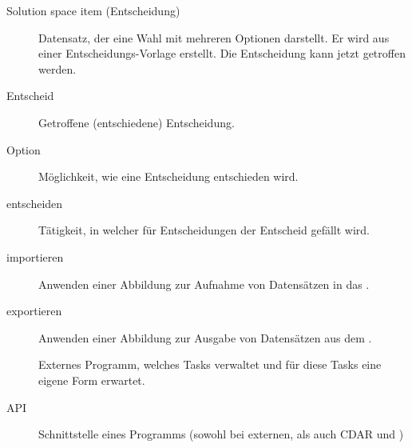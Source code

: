 \begin{description}
			\item[Solution space item (Entscheidung)] Datensatz, der eine Wahl mit mehreren Optionen darstellt.
				Er wird aus einer Entscheidungs-Vorlage erstellt.
				Die Entscheidung kann jetzt getroffen werden.
			\item[Entscheid] Getroffene (entschiedene) Entscheidung.
			\item[Option] Möglichkeit, wie eine Entscheidung entschieden wird.
			\item[entscheiden] Tätigkeit, in welcher für Entscheidungen der Entscheid gefällt wird.
			\item[importieren] Anwenden einer Abbildung zur Aufnahme von Datensätzen in das \eeppi.
			\item[exportieren] Anwenden einer Abbildung zur Ausgabe von Datensätzen aus dem \eeppi.
			\item[\ppt] Externes Programm, welches Tasks verwaltet und für diese Tasks eine eigene Form erwartet.
			\item[API] Schnittstelle eines Programms (sowohl bei externen, als auch CDAR und \eeppi)
		\end{description}

